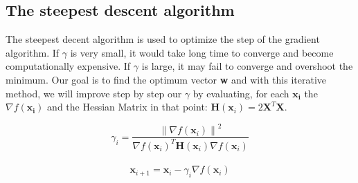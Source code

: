 \documentclass[a4paper,12pt,oneside,titlepage]{article}
\begin{document}
	\subsection{The steepest descent algorithm}
	The steepest decent algorithm is used to optimize the step of the gradient algorithm. If $\gamma$ is very small, it would take long time to converge and become computationally expensive. If $\gamma$ is large, it may fail to converge and overshoot the minimum. Our goal is to find the optimum vector \textbf{w} and with this iterative method, we will improve step by step our $\gamma$ by evaluating, for each $\mathbf{x_i}$ the $\nabla f ( \mathbf { x_i } ) $ and the Hessian Matrix in that point: $\mathbf { H } \left( \mathbf { x } _ { i } \right) = 2 \mathbf { X } ^ { T } \mathbf { X }$.
	
	\begin{flushright}
		\begin{equation}
		\gamma _ { i } = \frac { \left\| \nabla f \left( \mathbf { x } _ { i } \right) \right\| ^ { 2 } } { \nabla f \left( \mathbf { x } _ { i } \right) ^ { T } \mathbf { H } \left( \mathbf { x } _ { i } \right) \nabla f \left( \mathbf { x } _ { i } \right) }
		\end{equation}\\
		
		
		\begin{equation}
		\mathbf { x } _ { i + 1 } = \mathbf { x } _ { i } - \gamma _ { i } \nabla f \left( \mathbf { x } _ { i } \right)
		\end{equation}
	\end{flushright}
\end{document}
